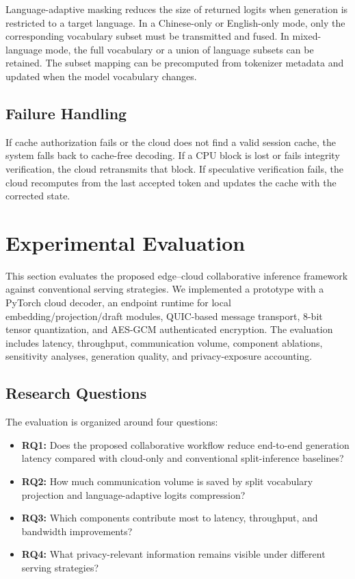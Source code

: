 \documentclass{article}
\begin{document}
Language-adaptive masking reduces the size of returned logits when generation is restricted to a target language. In a Chinese-only or English-only mode, only the corresponding vocabulary subset must be transmitted and fused. In mixed-language mode, the full vocabulary or a union of language subsets can be retained. The subset mapping can be precomputed from tokenizer metadata and updated when the model vocabulary changes.

\subsection{Failure Handling}

If cache authorization fails or the cloud does not find a valid session cache, the system falls back to cache-free decoding. If a CPU block is lost or fails integrity verification, the cloud retransmits that block. If speculative verification fails, the cloud recomputes from the last accepted token and updates the cache with the corrected state.




\FloatBarrier
\section{Experimental Evaluation}
\label{sec:evaluation}

This section evaluates the proposed edge--cloud collaborative inference framework against conventional serving strategies. We implemented a prototype with a PyTorch cloud decoder, an endpoint runtime for local embedding/projection/draft modules, QUIC-based message transport, 8-bit tensor quantization, and AES-GCM authenticated encryption. The evaluation includes latency, throughput, communication volume, component ablations, sensitivity analyses, generation quality, and privacy-exposure accounting.

\subsection{Research Questions}

The evaluation is organized around four questions:
\begin{itemize}
  \item \textbf{RQ1:} Does the proposed collaborative workflow reduce end-to-end generation latency compared with cloud-only and conventional split-inference baselines?
  \item \textbf{RQ2:} How much communication volume is saved by split vocabulary projection and language-adaptive logits compression?
  \item \textbf{RQ3:} Which components contribute most to latency, throughput, and bandwidth improvements?
  \item \textbf{RQ4:} What privacy-relevant information remains visible under different serving strategies?
\end{itemize}
\end{document}
